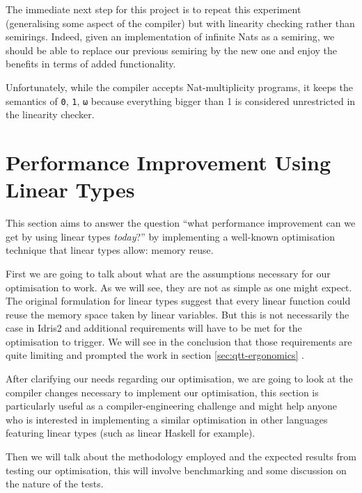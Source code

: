 \documentclass[
]{article}
\begin{document}
The immediate next step for this project is to repeat this experiment
(generalising some aspect of the compiler) but with linearity checking
rather than semirings. Indeed, given an implementation of infinite Nats
as a semiring, we should be able to replace our previous semiring by the
new one and enjoy the benefits in terms of added functionality.

Unfortunately, while the compiler accepts Nat-multiplicity programs, it
keeps the semantics of \texttt{0}, \texttt{1}, \texttt{ω} because
everything bigger than 1 is considered unrestricted in the linearity
checker.

\newpage

\hypertarget{performance-improvement-using-linear-types}{%
\section{Performance Improvement Using Linear
Types}\label{performance-improvement-using-linear-types}}

\label{sec:performance}

This section aims to answer the question ``what performance improvement
can we get by using linear types \emph{today}?'' by implementing a
well-known optimisation technique that linear types allow: memory reuse.

First we are going to talk about what are the assumptions necessary for
our optimisation to work. As we will see, they are not as simple as one
might expect. The original formulation for linear types suggest that
every linear function could reuse the memory space taken by linear
variables. But this is not necessarily the case in Idris2 and additional
requirements will have to be met for the optimisation to trigger. We
will see in the conclusion that those requirements are quite limiting
and prompted the work in section \ref{sec:qtt-ergonomics} .

After clarifying our needs regarding our optimisation, we are going to
look at the compiler changes necessary to implement our optimisation,
this section is particularly useful as a compiler-engineering challenge
and might help anyone who is interested in implementing a similar
optimisation in other languages featuring linear types (such as linear
Haskell for example).

Then we will talk about the methodology employed and the expected
results from testing our optimisation, this will involve benchmarking
and some discussion on the nature of the tests.
\end{document}
